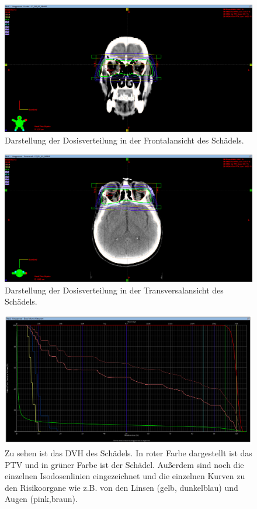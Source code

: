 \begin{figure}[h]
	\centering
	\includegraphics[width=\linewidth]{Bilder/EO_Y_mitPTV}
	\caption{Darstellung der Dosisverteilung in der Frontalansicht des Schädels.}
	\label{fig:eoymitptv}
\end{figure}

\begin{figure}[h]
	\centering
	\includegraphics[width=\linewidth]{Bilder/EO_Z}
	\caption{Darstellung der Dosisverteilung in der Transversalansicht des Schädels.}
	\label{fig:eoz}
\end{figure}

\begin{figure}[h]
	\centering
	\includegraphics[width=\linewidth]{Bilder/DVH_Einzel}
	\caption{Zu sehen ist das DVH des Schädels. In roter Farbe dargestellt ist das PTV und in grüner Farbe ist der Schädel. Außerdem sind noch die einzelnen Isodosenlinien eingezeichnet und die einzelnen Kurven zu den Risikoorgane wie z.B. von den Linsen (gelb, dunkelblau) und Augen (pink,braun).}
	\label{fig:dvheinzel}
\end{figure}
